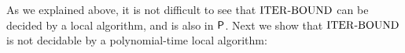 	As we explained above, it is not difficult to see that ${\mathrm{ITER\text{-}BOUND}}$ can be decided by a local algorithm,
and is also in ${\mathsf{P}}$.
Next we show that ${\mathrm{ITER\text{-}BOUND}}$ is not decidable by a polynomial-time local algorithm:



